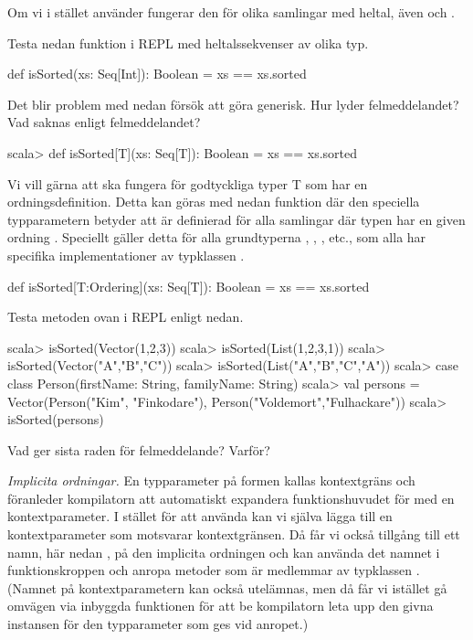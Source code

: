 Om vi i stället använder
 fungerar den för olika samlingar med heltal, även  och . 

\Subtask  Testa nedan funktion i REPL med heltalssekvenser av olika typ.
\begin{Code}
def isSorted(xs: Seq[Int]): Boolean = xs == xs.sorted
\end{Code}

\Subtask Det blir problem med nedan försök att göra  generisk. Hur lyder felmeddelandet? Vad saknas enligt felmeddelandet?
\begin{REPLnonum}
scala> def isSorted[T](xs: Seq[T]): Boolean = xs == xs.sorted
\end{REPLnonum}

\Subtask Vi vill gärna att  ska fungera för godtyckliga typer T som har en ordningsdefinition. Detta kan göras med nedan funktion där den speciella typparametern \code{[T:Ordering]} betyder att  är definierad för alla samlingar där typen  har en given ordning . Speciellt gäller detta för alla grundtyperna , , , etc., som alla har specifika implementationer av typklassen .
\begin{Code}
def isSorted[T:Ordering](xs: Seq[T]): Boolean = xs == xs.sorted
\end{Code}
Testa metoden ovan i REPL enligt nedan.
\begin{REPL}
scala> isSorted(Vector(1,2,3))
scala> isSorted(List(1,2,3,1))
scala> isSorted(Vector("A","B","C"))
scala> isSorted(List("A","B","C","A"))
scala> case class Person(firstName: String, familyName: String)
scala> val persons = Vector(Person("Kim", "Finkodare"), Person("Voldemort","Fulhackare"))
scala> isSorted(persons)
\end{REPL}
Vad ger sista raden för felmeddelande? Varför?


\Subtask \emph{Implicita ordningar.} En typparameter på formen \code{[T:Ordering]} kallas kontextgräns  och föranleder kompilatorn att automatiskt expandera funktionshuvudet för  med en kontextparameter. I stället för att använda \code{[T:Ordering]} kan vi själva lägga till en kontextparameter som motsvarar kontextgränsen. Då får vi också tillgång till ett namn, här nedan , på den implicita ordningen och kan använda det namnet i funktionskroppen och anropa metoder som är medlemmar av typklassen . (Namnet på kontextparametern kan också utelämnas, men då får vi istället gå omvägen via inbyggda funktionen  för att be kompilatorn leta upp den givna instansen för den typparameter som ges vid anropet.)

